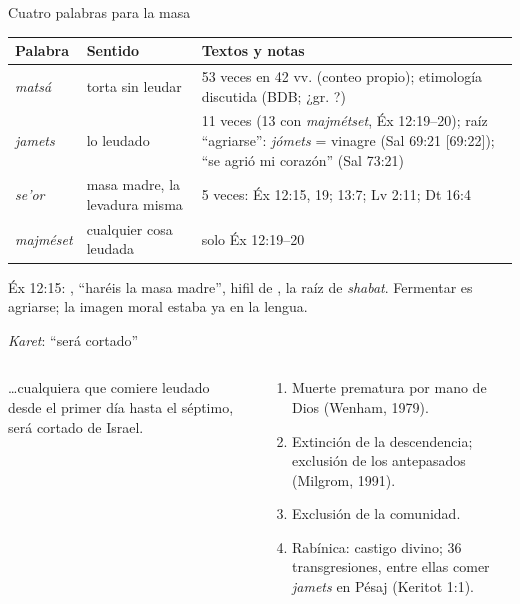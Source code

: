 \begin{frame}{Cuatro palabras para la masa}
\scriptsize\renewcommand{\arraystretch}{1.15}
\begin{tabular}{@{}L{2.4cm}L{3.0cm}L{6.6cm}@{}}
\toprule
\textbf{Palabra} & \textbf{Sentido} & \textbf{Textos y notas} \\ \midrule
{} \emph{matsá} & torta sin leudar & 53 veces en 42 vv. (conteo propio); etimología discutida (BDB; ¿gr. ?) \\
 \emph{jamets} & lo leudado & 11 veces (13 con \emph{majmétset}, Éx 12:19--20); raíz ``agriarse'': \emph{jómets} = vinagre (Sal 69:21 [69:22]); ``se agrió mi corazón'' (Sal 73:21) \\
 \emph{se'or} & masa madre, la levadura misma & 5 veces: Éx 12:15, 19; 13:7; Lv 2:11; Dt 16:4 \\
 \emph{majméset} & cualquier cosa leudada & solo Éx 12:19--20 \\
\bottomrule
\end{tabular}\par\medskip
\small Éx 12:15: , ``haréis  la masa madre'', hifil de , la raíz de \emph{shabat}. Fermentar es agriarse; la imagen moral estaba ya en la lengua.\par
{}
\end{frame}

\begin{frame}{\emph{Karet}: ``será cortado''}
\begin{columns}[t,onlytextwidth]
\begin{column}{0.46\textwidth}
\centering{}
\begin{cita}\ldots{}cualquiera que comiere leudado desde el primer día hasta el séptimo, será cortado de Israel.\end{cita}
\end{column}
\begin{column}{0.52\textwidth}\scriptsize
\begin{enumerate}
\item Muerte prematura por mano de Dios (Wenham, 1979).
\item Extinción de la descendencia; exclusión de los antepasados (Milgrom, 1991).
\item Exclusión de la comunidad.
\item Rabínica: castigo divino; 36 transgresiones, entre ellas comer \emph{jamets} en Pésaj (Keritot 1:1).
\end{enumerate}
\end{column}
\end{columns}
\end{frame}

